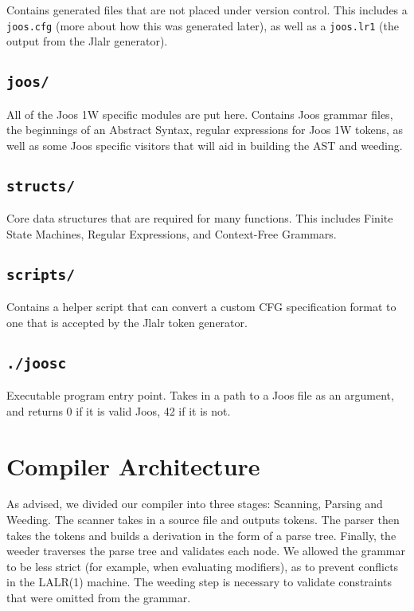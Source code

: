 \documentclass[12pt, a4paper]{article}
\begin{document}
Contains generated files that are not placed under version control. This includes a \verb|joos.cfg| (more about how this was generated later), as well as a \verb|joos.lr1| (the output from the Jlalr generator).

\subsection{\texttt{joos/}}

All of the Joos 1W specific modules are put here. Contains Joos grammar files, the beginnings of an Abstract Syntax, regular expressions for Joos 1W tokens, as well as some Joos specific visitors that will aid in building the AST and weeding.

\subsection{\texttt{structs/}}

Core data structures that are required for many functions. This includes Finite State Machines, Regular Expressions, and Context-Free Grammars.

\subsection{\texttt{scripts/}}

Contains a helper script that can convert a custom CFG specification format to one that is accepted by the Jlalr token generator.


\subsection{\texttt{./joosc}}

Executable program entry point. Takes in a path to a Joos file as an argument, and returns 0 if it is valid Joos, 42 if it is not.

\section{Compiler Architecture}

As advised, we divided our compiler into three stages: Scanning, Parsing and Weeding. The scanner takes in a source file and outputs tokens. The parser then takes the tokens and builds a derivation in the form of a parse tree. Finally, the weeder traverses the parse tree and validates each node. We allowed the grammar to be  less strict (for example, when evaluating modifiers), as to prevent conflicts in the LALR(1) machine. The weeding step is necessary to validate constraints that were omitted from the grammar.
\end{document}
